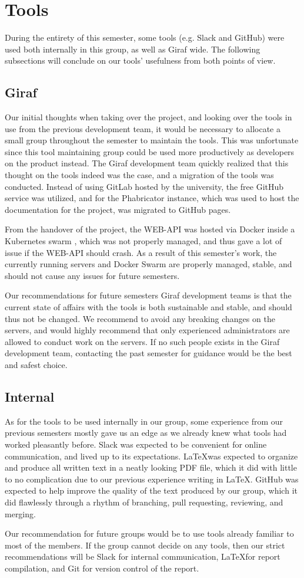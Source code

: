 \section{Tools}
During the entirety of this semester, some tools (e.g. Slack and GitHub) were used both internally in this group, as well as Giraf wide.
The following subsections will conclude on our tools' usefulness from both points of view.

\subsection{Giraf}
Our initial thoughts when taking over the project, and looking over the tools in use from the previous development team, it would be necessary to allocate a small group throughout the semester to maintain the tools.
This was unfortunate since this tool maintaining group could be used more productively as developers on the product instead.
The Giraf development team quickly realized that this thought on the tools indeed was the case, and a migration of the tools was conducted.
Instead of using GitLab hosted by the university, the free GitHub service was utilized, and for the Phabricator instance, which was used to host the documentation for the project, was migrated to GitHub pages.

From the handover of the project, the WEB-API was hosted via Docker inside a Kubernetes swarm , which was not properly managed, and thus gave a lot of issue if the WEB-API should crash.
As a result of this semester's work, the currently running servers and Docker Swarm are properly managed, stable, and should not cause any issues for future semesters.

Our recommendations for future semesters Giraf development teams is that the current state of affairs with the tools is both sustainable and stable, and should thus not be changed.
We recommend to avoid any breaking changes on the servers, and would highly recommend that only experienced administrators are allowed to conduct work on the servers.
If no such people exists in the Giraf development team, contacting the past semester for guidance would be the best and safest choice.

\subsection{Internal}
As for the tools to be used internally in our group, some experience from our previous semesters mostly gave us an edge as we already knew what tools had worked pleasantly before.
Slack was expected to be convenient for online communication, and lived up to its expectations.
\LaTeX was expected to organize and produce all written text in a neatly looking PDF file, which it did with little to no complication due to our previous experience writing in \LaTeX.
GitHub was expected to help improve the quality of the text produced by our group, which it did flawlessly through a rhythm of branching, pull requesting, reviewing, and merging.

Our recommendation for future groups would be to use tools already familiar to most of the members.
If the group cannot decide on any tools, then our strict recommendations will be Slack for internal communication, \LaTeX for report compilation, and Git for version control of the report.
